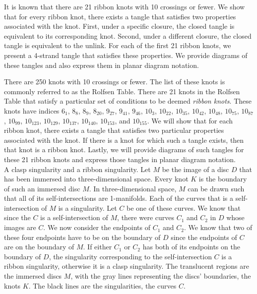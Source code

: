 
\diagrams
\theorems

\begin{paperabs}
It is known that there are 21 ribbon knots with 10 crossings or fewer.
We show that for every ribbon knot, there exists a tangle that satisfies two
properties associated with the knot.
First, under a specific closure, the closed tangle is equivalent to its
corresponding knot.
Second, under a different closure, the closed tangle is equivalent to the
unlink.
For each of the first 21 ribbon knots, we present a 4-strand tangle that
satisfies these properties.
We provide diagrams of these tangles and also express them in planar diagram
notation.
\end{paperabs}
\begin{paper}

There are 250 knots with 10 crossings or fewer.
The list of these knots is commonly referred to as the Rolfsen Table.
There are 21 knots in the Rolfsen Table that satisfy a particular set of
conditions to be deemed \textit{ribbon knots}.
These knots have indices $6_1$, $8_8$, $8_9$, $8_{20}$, $9_{27}$, $9_{41}$,
$9_{46}$, $10_3$, $10_{22}$, $10_{35}$, $10_{42}$, $10_{48}$, $10_{75}$,
$10_{87}$, $10_{99}$, $10_{123}$, $10_{129}$, $10_{137}$, $10_{140}$,
$10_{153}$, and $10_{155}$.
We will show that for each ribbon knot, there exists a tangle that satisfies two
particular properties associated with the knot.
If there is a knot for which such a tangle exists, then that knot is a ribbon
knot.
Lastly, we will provide diagrams of such tangles for these 21 ribbon knots and
express those tangles in planar diagram notation.\\

{A clasp singularity and a ribbon singularity.
Let $M$ be the image of a disc $D$ that has been immersed into three-dimensional
space.
Every knot $K$ is the boundary of such an immersed disc $M$.
In three-dimensional space, $M$ can be drawn such that all of its
self-intersections are 1-manifolds.
Each of the curves that is a self-intersection of $M$ is a singularity.
Let $C$ be one of these curves.
We know that since the $C$ is a self-intersection of $M$, there were curves
$C_1$ and $C_2$ in $D$ whose images are $C$.
We now consider the endpoints of $C_1$ and $C_2$.
We know that two of these four endpoints have to be on the boundary of $D$ since
the endpoints of $C$ are on the boundary of $M$.
If either $C_1$ or $C_2$ has both of its endpoints on the boundary of $D$, the
singularity corresponding to the self-intersection $C$ is a ribbon singularity,
otherwise it is a clasp singularity.
The translucent regions are the immersed discs $M$, with the gray lines
representing the discs' boundaries, the knots $K$.
The black lines are the singularities, the curves $C$.}


\end{paper}
